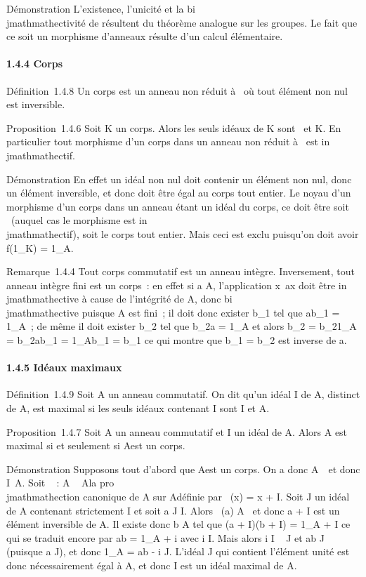 \documentclass[]{article}
\begin{document}
Démonstration L'existence, l'unicité et la bi\\jmathmathectivité de
\overlinef résultent du théorème analogue sur les
groupes. Le fait que ce soit un morphisme d'anneaux résulte d'un calcul
élémentaire.

\paragraph{1.4.4 Corps}

Définition~1.4.8 Un corps est un anneau non réduit à
\0\ où tout élément non nul est
inversible.

Proposition~1.4.6 Soit K un corps. Alors les seuls idéaux de K sont
\0\ et K. En particulier tout
morphisme d'un corps dans un anneau non réduit à
\0\ est in\\jmathmathectif.

Démonstration En effet un idéal non nul doit contenir un élément non
nul, donc un élément inversible, et donc doit être égal au corps tout
entier. Le noyau d'un morphisme d'un corps dans un anneau étant un idéal
du corps, ce doit être soit \0\
(auquel cas le morphisme est in\\jmathmathectif), soit le corps tout entier. Mais
ceci est exclu puisqu'on doit avoir f(1_K) = 1_A.

Remarque~1.4.4 Tout corps commutatif est un anneau intègre. Inversement,
tout anneau intègre fini est un corps~: en effet si a \in A, l'application
x\mapsto~ax doit être in\\jmathmathective à cause de
l'intégrité de A, donc bi\\jmathmathective puisque A est fini~; il doit donc
exister b_1 tel que ab_1 = 1_A~; de même il
doit exister b_2 tel que b_2a = 1_A et alors
b_2 = b_21_A = b_2ab_1 =
1_Ab_1 = b_1 ce qui montre que b_1 =
b_2 est inverse de a.

\paragraph{1.4.5 Idéaux maximaux}

Définition~1.4.9 Soit A un anneau commutatif. On dit qu'un idéal I de A,
distinct de A, est maximal si les seuls idéaux contenant I sont I et A.

Proposition~1.4.7 Soit A un anneau commutatif et I un idéal de A. Alors
A est maximal si et seulement si A\diagupI est un corps.

Démonstration Supposons tout d'abord que A\diagupI est un corps. On a donc
A\diagupI\neq~\0\ et
donc I\neq~A. Soit \pi~ : A \rightarrow~ A\diagupI la pro\\jmathmathection
canonique de A sur A\diagupI définie par \pi~(x) = x + I. Soit J un idéal de A
contenant strictement I et soit a \in J \diagdown I. Alors \pi~(a) \in A\diagupI
\diagdown\0\ et donc a + I est un élément
inversible de A\diagupI. Il existe donc b \in A tel que (a + I)(b + I) =
1_A + I ce qui se traduit encore par ab = 1_A + i avec
i \in I. Mais alors i \in I \subset~ J et ab \in J (puisque a \in J), et donc
1_A = ab - i \in J. L'idéal J qui contient l'élément unité est
donc nécessairement égal à A, et donc I est un idéal maximal de A.
\end{document}
